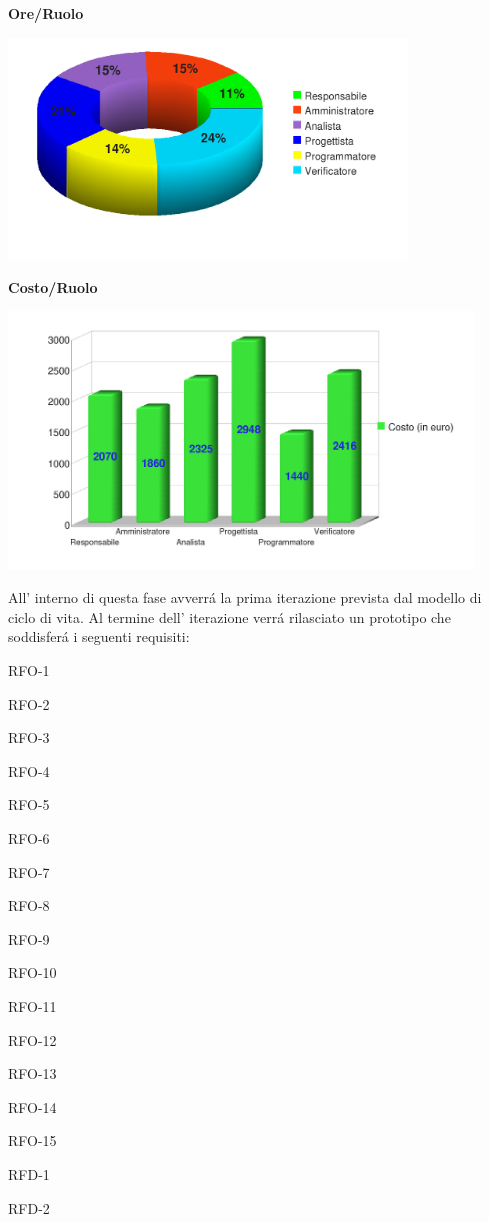 \begin{center}\textbf{Ore/Ruolo}
\end{center}
\includegraphics[width=300pt]{OreTotali}
\newpage
\begin{center}\textbf{Costo/Ruolo}
\end{center}
\includegraphics[width=350pt]{CostiTotali}

All' interno di questa fase avverr\'a la prima iterazione prevista dal modello di ciclo di vita.
Al termine dell' iterazione verr\'a rilasciato un prototipo che soddisfer\'a i seguenti requisiti:\\

\begin{elenconumerato}[\textbf{}]{\subsubsecindent}
\item RFO-1
\item RFO-2
\item RFO-3
\item RFO-4
\item RFO-5
\item RFO-6
\item RFO-7
\item RFO-8
\item RFO-9
\item RFO-10
\item RFO-11
\item RFO-12
\item RFO-13
\item RFO-14
\item RFO-15
\item RFD-1
\item RFD-2
\end{elenconumerato}

